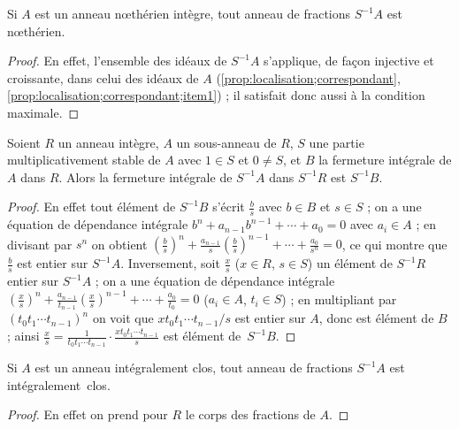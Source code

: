 \documentclass[11pt, %
  title in boldface,
  theorem in new line,
  theorem numbering = section,
  number theorems separately,
  simple name,
]{beaulivre}
\begin{document}
    \begin{corollary}\label{cor:localisation d'un anneau nœthérien est nœthérien}
        Si \( A \) est un anneau nœthérien intègre, tout anneau de fractions \( S^{-1}A \) est nœthérien.
    \end{corollary}
    \begin{proof}
        En effet, l'ensemble des idéaux de \( S^{-1} A \) s'applique, de façon injective et croissante, dans celui des idéaux de \( A \) (\cref{prop:localisation;correspondant}, \ref{prop:localisation;correspondant;item1}) ; il satisfait donc aussi à la condition maximale.
    \end{proof}

    \begin{proposition}\label{prop:fermeture de la localisation est localisé de la fermeture intégrale}
        Soient \( R \) un anneau intègre, \( A \) un sous-anneau de \( R \), \( S \) une partie multiplicativement stable de \( A \) avec \( 1 \in S \) et \( 0 \neq S \), et \( B \) la fermeture intégrale de \( A \) dans \( R \). Alors la fermeture intégrale de \( S^{-1} A \) dans \( S^{-1} R \) est \( S^{-1} B \).
    \end{proposition}
    \begin{proof}
        En effet tout élément de \( S^{-1} B \) s'écrit \( \frac{b}{s} \) avec \( b \in B \) et \( s \in S \) ; on a une équation de dépendance intégrale \( b^n + a_{n-1} b^{n-1} + \cdots + a_0 = 0 \) avec \( a_i \in A \) ; en divisant par \( s^n \) on obtient \( \left(\frac{b}{s}\right)^n + \frac{a_{n-1}}{s} \left(\frac{b}{s}\right)^{n-1} + \cdots + \frac{a_0}{s^n} = 0 \), ce qui montre que \( \frac{b}{s} \) est entier sur \( S^{-1} A \). Inversement, soit \( \frac{x}{s} \) (\( x \in R \), \( s \in S \)) un élément de \( S^{-1} R \) entier sur \( S^{-1} A \) ; on a une équation de dépendance intégrale \( \left(\frac{x}{s}\right)^n + \frac{a_{n-1}}{t_{n-1}} \left(\frac{x}{s}\right)^{n-1} + \cdots + \frac{a_0}{t_0} = 0 \) (\( a_i \in A \), \( t_i \in S \)) ; en multipliant par \( (t_0 t_1 \cdots t_{n-1})^n \) on voit que \( x t_0 t_1 \cdots t_{n-1} / s \) est entier sur \( A \), donc est élément de \( B \) ; ainsi \( \frac{x}{s} = \frac{1}{t_0 t_1 \cdots t_{n-1}} \cdot \frac{x t_0 t_1 \cdots t_{n-1}}{s} \) est élément de~\( S^{-1} B \).
    \end{proof}

    \begin{corollary}\label{cor:localisation d'un anneau intégralement clos est intégralement clos}
        Si \( A \) est un anneau intégralement clos, tout anneau de fractions \( S^{-1} A \) est intégralement~clos.
    \end{corollary}
    \begin{proof}
        En effet on prend pour \( R \) le corps des fractions de \( A \).
    \end{proof}
\end{document}
